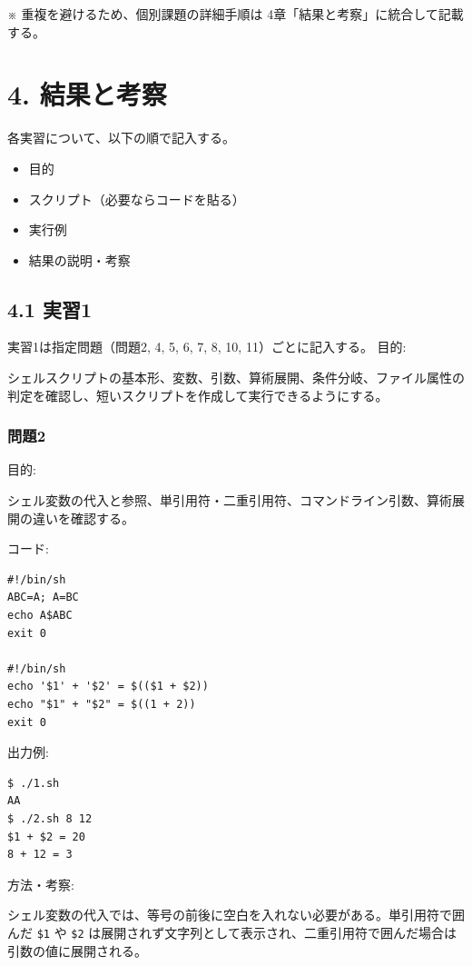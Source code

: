 \documentclass[12pt,a4paper]{jsarticle}
\begin{document}
\noindent
※ 重複を避けるため、個別課題の詳細手順は 4章「結果と考察」に統合して記載する。

\newpage

\section*{4. 結果と考察}

各実習について、以下の順で記入する。
\begin{itemize}
    \item 目的
    \item スクリプト（必要ならコードを貼る）
    \item 実行例
    \item 結果の説明・考察
\end{itemize}

\subsection*{4.1 実習1}

実習1は指定問題（問題2, 4, 5, 6, 7, 8, 10, 11）ごとに記入する。
目的:\par
シェルスクリプトの基本形、変数、引数、算術展開、条件分岐、ファイル属性の判定を確認し、短いスクリプトを作成して実行できるようにする。

\subsubsection*{問題2}
目的:\par
シェル変数の代入と参照、単引用符・二重引用符、コマンドライン引数、算術展開の違いを確認する。

コード:\par
\begin{lstlisting}
#!/bin/sh
ABC=A; A=BC
echo A$ABC
exit 0

#!/bin/sh
echo '$1' + '$2' = $(($1 + $2))
echo "$1" + "$2" = $((1 + 2))
exit 0
\end{lstlisting}
出力例:\par
\begin{lstlisting}
$ ./1.sh
AA
$ ./2.sh 8 12
$1 + $2 = 20
8 + 12 = 3
\end{lstlisting}
方法・考察:\par
シェル変数の代入では、等号の前後に空白を入れない必要がある。単引用符で囲んだ \texttt{\$1} や \texttt{\$2} は展開されず文字列として表示され、二重引用符で囲んだ場合は引数の値に展開される。

\vspace{0.6cm}
\end{document}
